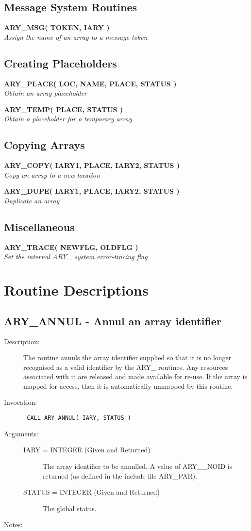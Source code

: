 \documentclass[twoside,11pt]{article}
\newcommand{\xlabel}[1]{}
\newcommand{\noteroutine}[2]{\textbf{#1}\hspace*{\fill}\nopagebreak \\
                             \hspace*{3em}\emph{#2}\hspace*{\fill}\par}
\newlength{\sstbannerlength}
\newlength{\sstcaptionlength}
\newlength{\sstexampleslength}
\newlength{\sstexampleswidth}
\newcommand{\sstroutine}[3]{
   \goodbreak
   \rule{\textwidth}{0.5mm}
   \vspace{-7ex}
   \newline
   \settowidth{\sstbannerlength}{{\Large {\bf #1}}}
   \setlength{\sstcaptionlength}{\textwidth}
   \setlength{\sstexampleslength}{\textwidth}
   \addtolength{\sstbannerlength}{0.5em}
   \addtolength{\sstcaptionlength}{-2.0\sstbannerlength}
   \addtolength{\sstcaptionlength}{-5.0pt}
   \settowidth{\sstexampleswidth}{{\bf Examples:}}
   \addtolength{\sstexampleslength}{-\sstexampleswidth}
   \parbox[t]{\sstbannerlength}{\flushleft{\Large {\bf #1}}}
   \parbox[t]{\sstcaptionlength}{\center{\Large #2}}
   \parbox[t]{\sstbannerlength}{\flushright{\Large {\bf #1}}}
   \begin{description}
      #3
   \end{description}
}
\newcommand{\sstdescription}[1]{\item[Description:] #1}
\newcommand{\sstinvocation}[1]{\item[Invocation:]\hspace{0.4em}{\tt #1}}
\newcommand{\sstarguments}[1]{
   \item[Arguments:] \mbox{} \\
   \vspace{-3.5ex}
   \begin{description}
      #1
   \end{description}
}
\newcommand{\sstsubsection}[1]{ \item[{#1}] \mbox{} \\}
\newcommand{\sstnotes}[1]{\item[Notes:] \mbox{} \\[1.3ex] #1}
\newcommand{\sstitemlist}[1]{
  \mbox{} \\
  \vspace{-3.5ex}
  \begin{itemize}
     #1
  \end{itemize}
}
\newcommand{\ssttt}{\tt}
\renewcommand{\sstroutine}[3]{
      \subsection{#1\xlabel{#1}-\label{#1}#2}
      \begin{description}
         #3
      \end{description}
   }
\renewcommand{\sstdescription}[1]{\item[Description:]
      \begin{description}
         #1
      \end{description}
   }
\renewcommand{\sstinvocation}[1]{\item[Invocation:]
      \begin{description}
         {\ssttt #1}
      \end{description}
   }
\renewcommand{\sstarguments}[1]{
      \item[Arguments:]
      \begin{description}
         #1
      \end{description}
   }
\renewcommand{\sstsubsection}[1]{\item[{#1}]}
\renewcommand{\sstnotes}[1]{\item[Notes:]
      \begin{description}
         #1
      \end{description}
   }
\newcommand{\sstitemlist}[1]{
      \begin{itemize}
         #1
      \end{itemize}
   }
\begin{document}
\begin{eqn*}
\subsection{\xlabel{message_system_routines}Message System Routines}
\label{message_system_routines}

\noteroutine{ARY\_MSG( TOKEN, IARY )}
            {Assign the name of an array to a message token}


\subsection{\xlabel{creating_placeholders}Creating Placeholders}
\label{creating_placeholders}

\noteroutine{ARY\_PLACE( LOC, NAME, PLACE, STATUS )}
            {Obtain an array placeholder}
\noteroutine{ARY\_TEMP( PLACE, STATUS )}
            {Obtain a placeholder for a temporary array}


\subsection{\xlabel{copying_arrays}Copying Arrays}
\label{copying_arrays}

\noteroutine{ARY\_COPY( IARY1, PLACE, IARY2, STATUS )}
            {Copy an array to a new location}
\noteroutine{ARY\_DUPE( IARY1, PLACE, IARY2, STATUS )}
            {Duplicate an array}


\subsection{\xlabel{miscellaneous}Miscellaneous}
\label{miscellaneous}

\noteroutine{ARY\_TRACE( NEWFLG, OLDFLG )}
            {Set the internal ARY\_ system error-tracing flag}

\newpage
\section{\xlabel{routine_descriptions}Routine Descriptions}
\label{routine_descriptions}
\label{ss:routinedescriptions}

\sstroutine{
   ARY\_ANNUL
}{
   Annul an array identifier
}{
   \sstdescription{
      The routine annuls the array identifier supplied so that it is no
      longer recognised as a valid identifier by the ARY\_ routines.
      Any resources associated with it are released and made available
      for re-use. If the array is mapped for access, then it is
      automatically unmapped by this routine.
   }
   \sstinvocation{
      CALL ARY\_ANNUL( IARY, STATUS )
   }
   \sstarguments{
      \sstsubsection{
         IARY = INTEGER (Given and Returned)
      }{
         The array identifier to be annulled. A value of ARY\_\_NOID is
         returned (as defined in the include file ARY\_PAR).
      }
      \sstsubsection{
         STATUS = INTEGER (Given and Returned)
      }{
         The global status.
      }
   }
   \sstnotes{
      \sstitemlist{

}}}
\end{eqn*}
\end{document}
